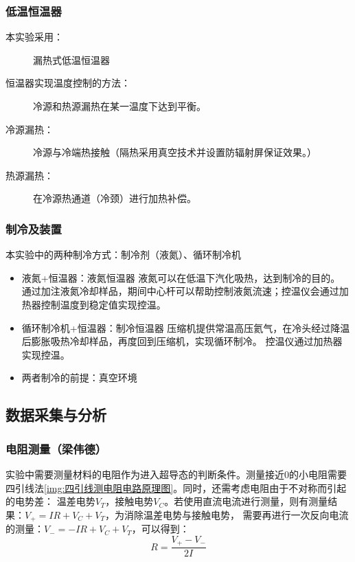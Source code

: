 \documentclass{spaexp}
\begin{document}
            \subsubsection{低温恒温器}
                \begin{description}
                    \item[本实验采用：]漏热式低温恒温器
                    \item[恒温器实现温度控制的方法：]冷源和热源漏热在某一温度下达到平衡。
                    \item[冷源漏热：]冷源与冷端热接触（隔热采用真空技术并设置防辐射屏保证效果。）
                    \item[热源漏热：]在冷源热通道（冷颈）进行加热补偿。
                \end{description}
                
            \subsubsection{制冷及装置}
                本实验中的两种制冷方式：制冷剂（液氮）、循环制冷机
                \begin{itemize}
                    \item 液氮+恒温器：液氮恒温器
                    液氮可以在低温下汽化吸热，达到制冷的目的。
                    通过加注液氮冷却样品，期间中心杆可以帮助控制液氮流速；控温仪会通过加热器控制温度到稳定值实现控温。
                    \item 循环制冷机+恒温器：制冷恒温器
                    压缩机提供常温高压氦气，在冷头经过降温后膨胀吸热冷却样品，再度回到压缩机，实现循环制冷。
                    控温仪通过加热器实现控温。
                    \item 两者制冷的前提：真空环境
                \end{itemize}
        \subsection{数据采集与分析}
            \subsubsection{电阻测量（梁伟德）}
            实验中需要测量材料的电阻作为进入超导态的判断条件。测量接近0的小电阻需要四引线法\autoref{img:四引线测电阻电路原理图}。同时，还需考虑电阻由于不对称而引起的电势差：
            温差电势$V_T$，接触电势$V_C$。若使用直流电流进行测量，则有测量结果：$V_+ = IR + V_C + V_T$，为消除温差电势与接触电势，
            需要再进行一次反向电流的测量：$V_- = -IR + V_C + V_T$，可以得到：
            \begin{equation}
                R = \frac{V_+ - V_-}{2I}
            \end{equation}
\end{document}
